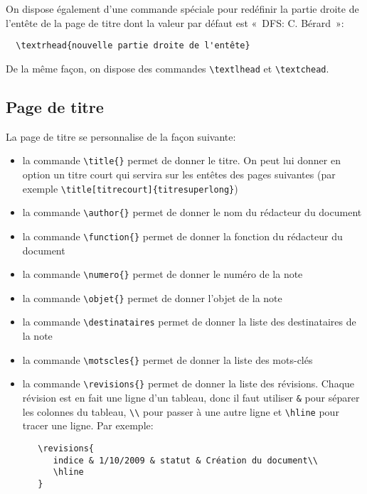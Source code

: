 \documentclass[fr,biblatex]{supaero-note}
\begin{document}
On dispose également d'une commande spéciale pour redéfinir la partie
droite de l'entête de la page de titre dont la valeur par défaut est
«~DFS: C. Bérard~»:

\begin{verbatim}
  \textrhead{nouvelle partie droite de l'entête}
\end{verbatim}

De la même façon, on dispose des commandes \verb!\textlhead! et
\verb!\textchead!.

\subsection{Page de titre}
\label{sec:page-de-titre}

La page de titre se personnalise de la façon suivante:

\begin{itemize}
\item la commande \verb!\title{}! permet de donner le titre. On peut
  lui donner en option un titre court qui servira sur les entêtes des
  pages suivantes (par exemple
  \verb!\title[titrecourt]{titresuperlong}!)
\item la commande \verb!\author{}! permet de donner le nom du
  rédacteur du document
\item la commande \verb!\function{}! permet de donner la fonction du
  rédacteur du document
\item la commande \verb!\numero{}! permet de donner le numéro de la
  note
\item la commande \verb!\objet{}! permet de donner l'objet de la note
\item la commande \verb!\destinataires! permet de donner la liste des
  destinataires de la note
\item la commande \verb!\motscles{}! permet de donner la liste des
  mots-clés
\item la commande \verb!\revisions{}! permet de donner la liste des
  révisions. Chaque révision est en fait une ligne d'un tableau, donc
  il faut utiliser \verb!&! pour séparer les colonnes du tableau,
  \verb!\\! pour passer à une autre ligne et \verb!\hline! pour tracer
  une ligne. Par exemple:

\begin{verbatim}
   \revisions{
      indice & 1/10/2009 & statut & Création du document\\
      \hline
   } 
\end{verbatim}
\end{itemize}
\end{document}
